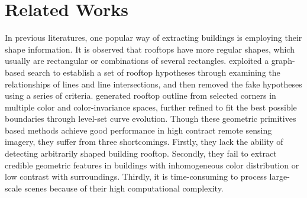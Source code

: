 \documentclass[runningheads]{llncs}
\begin{document}
   
\section{Related Works}
   In previous literatures, one popular way of extracting buildings is employing their shape information. It is observed that rooftops have more regular shapes, which usually are rectangular or combinations of several rectangles.\cite{noronha2001detection}\cite{nosrati2009novel}\cite{izadi2012three}\cite{wang2015efficient} exploited a graph-based search to establish a set of rooftop hypotheses through examining the relationships of lines and line intersections, and then removed the fake hypotheses using a series of criteria. \cite{cote2013automatic} generated rooftop outline from selected corners in  multiple color and color-invariance spaces, further refined to fit the best possible boundaries through level-set curve evolution. Though these geometric primitives based methods achieve good performance in high contract remote sensing imagery, they suffer from three  shortcomings. Firstly, they lack the ability of detecting arbitrarily shaped building rooftop. Secondly, they fail to  extract credible geometric features in buildings with inhomogeneous color distribution or low contrast with surroundings. Thirdly, it is time-consuming to process large-scale scenes because of their high computational complexity.	
	
\end{document}
